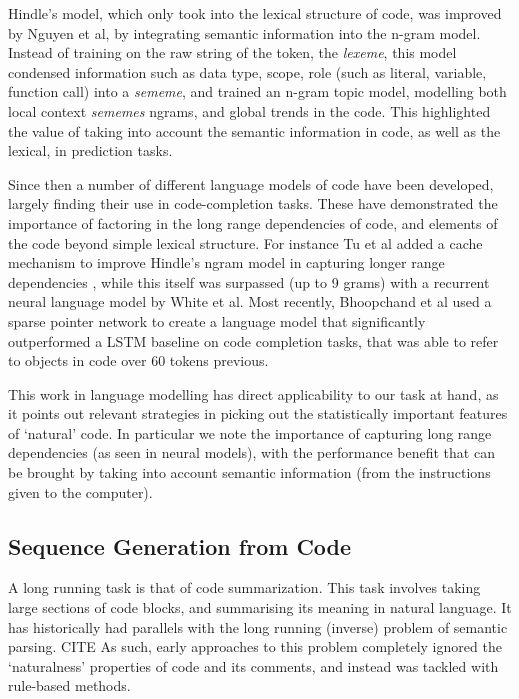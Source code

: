 Hindle's model, which only took into the lexical structure of code, was improved by Nguyen et al\cite{nguyen_statistical_2013}, by integrating semantic information into the n-gram model.
Instead of training on the raw string of the token, the \textit{lexeme}, this model condensed information such as data type, scope, role (such as literal, variable, function call) into a \textit{sememe}, and trained an n-gram topic model, modelling both local context \textit{sememes} ngrams, and global trends in the code.
This highlighted the value of taking into account the semantic information in code, as well as the lexical, in prediction tasks.

Since then a number of different language models of code have been developed, largely finding their use in code-completion tasks. These have demonstrated the importance of factoring in the long range dependencies of code, and elements of the code beyond simple lexical structure. For instance Tu et al added a cache mechanism to improve Hindle's ngram model in capturing longer range dependencies  \cite{tu_localness_nodate}, while this itself was surpassed (up to 9 grams) with a recurrent neural language model by White et al\cite{white_toward_2015}.
Most recently, Bhoopchand et al used a sparse pointer network to create a language model that significantly outperformed a LSTM baseline on code completion tasks, that was able to refer to objects in code over 60 tokens previous\cite{bhoopchand_learning_2016}.

This work in language modelling has direct applicability to our task at hand, as it points out relevant strategies in picking out the statistically important features of `natural' code. In particular we note the importance of capturing long range dependencies (as seen in neural models), with the performance benefit that can be brought by taking into account semantic information (from the instructions given to the computer).

\subsection{Sequence Generation from Code}

A long running task is that of code summarization. 
This task involves taking large sections of code blocks, and summarising its meaning in natural language. It has historically had parallels with the long running (inverse) problem of semantic parsing. CITE
As such, early approaches to this problem completely ignored the `naturalness' properties of code and its comments, and instead was tackled with rule-based methods. 

